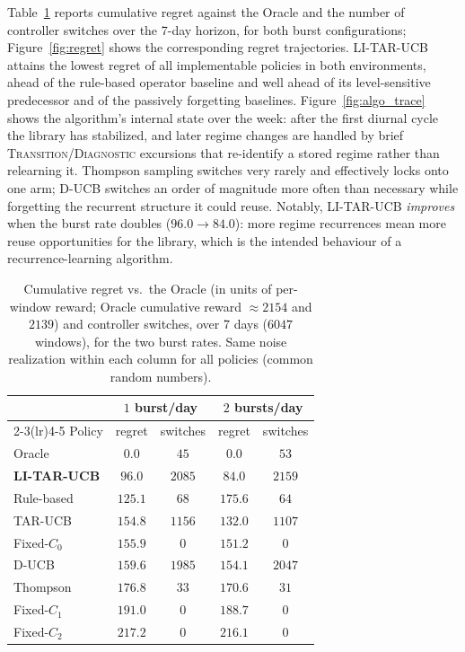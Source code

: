 \documentclass[11pt]{article}
\begin{document}
Table~\ref{tab:main_results} reports cumulative regret against the Oracle and the number of controller switches over the 7-day horizon, for both burst configurations; Figure~\ref{fig:regret} shows the corresponding regret trajectories. LI-TAR-UCB attains the lowest regret of all implementable policies in both environments, ahead of the rule-based operator baseline and well ahead of its level-sensitive predecessor and of the passively forgetting baselines. Figure~\ref{fig:algo_trace} shows the algorithm's internal state over the week: after the first diurnal cycle the library has stabilized, and later regime changes are handled by brief \textsc{Transition}/\textsc{Diagnostic} excursions that re-identify a stored regime rather than relearning it. Thompson sampling switches very rarely and effectively locks onto one arm; D-UCB switches an order of magnitude more often than necessary while forgetting the recurrent structure it could reuse. Notably, LI-TAR-UCB \emph{improves} when the burst rate doubles ($96.0\to84.0$): more regime recurrences mean more reuse opportunities for the library, which is the intended behaviour of a recurrence-learning algorithm.

\begin{table}[h]
\centering
\begin{tabular}{lcccc}
\toprule
 & \multicolumn{2}{c}{$1$ burst/day} & \multicolumn{2}{c}{$2$ bursts/day} \\
\cmidrule(lr){2-3}\cmidrule(lr){4-5}
Policy & regret & switches & regret & switches \\
\midrule
Oracle       & $0.0$   & $45$   & $0.0$   & $53$ \\
\textbf{LI-TAR-UCB} & $\mathbf{96.0}$  & $2085$ & $\mathbf{84.0}$  & $2159$ \\
Rule-based   & $125.1$ & $68$   & $175.6$ & $64$ \\
TAR-UCB      & $154.8$ & $1156$ & $132.0$ & $1107$ \\
Fixed-$C_0$  & $155.9$ & $0$    & $151.2$ & $0$ \\
D-UCB        & $159.6$ & $1985$ & $154.1$ & $2047$ \\
Thompson     & $176.8$ & $33$   & $170.6$ & $31$ \\
Fixed-$C_1$  & $191.0$ & $0$    & $188.7$ & $0$ \\
Fixed-$C_2$  & $217.2$ & $0$    & $216.1$ & $0$ \\
\bottomrule
\end{tabular}
\caption{Cumulative regret vs.\ the Oracle (in units of per-window reward; Oracle cumulative reward $\approx2154$ and $2139$) and controller switches, over 7 days ($6047$ windows), for the two burst rates. Same noise realization within each column for all policies (common random numbers).}
\label{tab:main_results}
\end{table}
\end{document}
